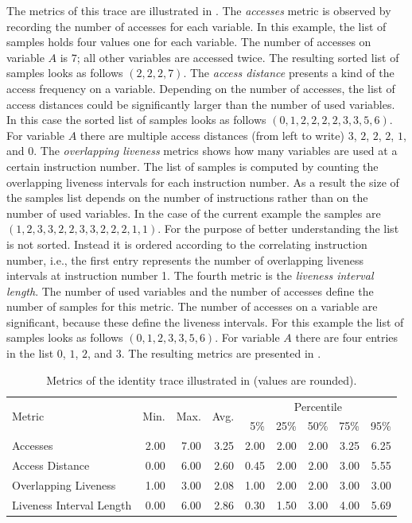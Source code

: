 \documentclass[onecolumn, openright, master, english, signatures]{dbrgrptt}
\begin{document}
The metrics of this \ac{trace} are illustrated in .
The \emph{accesses} metric is observed by recording the number of accesses for each variable.
In this example, the list of samples holds four values one for each variable.
The number of accesses on variable $A$ is $7$; all other variables are accessed twice.
The resulting sorted list of samples looks as follows $(2, 2, 2, 7)$.
The \emph{access distance} presents a kind of the access frequency on a variable.
Depending on the number of accesses, the list of access distances could be significantly larger than the number of used variables.
In this case the sorted list of samples looks as follows $(0, 1, 2, 2, 2, 2, 3, 3, 5, 6)$.
For variable $A$ there are multiple access distances (from left to write) $3$, $2$, $2$, $2$, $1$, and $0$.
The \emph{overlapping liveness} metrics shows how many variables are used at a certain instruction number.
The list of samples is computed by counting the overlapping liveness intervals for each instruction number.
As a result the size of the samples list depends on the number of instructions rather than on the number of used variables.
In the case of the current example the samples are $(1, 2, 3, 3, 2, 2, 3, 3, 2, 2, 2, 1, 1)$.
For the purpose of better understanding the list is not sorted.
Instead it is ordered according to the correlating instruction number, i.e., the first entry represents the number of overlapping liveness intervals at instruction number 1.
The fourth metric is the \emph{liveness interval length}.
The number of used variables and the number of accesses define the number of samples for this metric.
The number of accesses on a variable are significant, because these define the liveness intervals.
For this example the list of samples looks as follows $(0, 1, 2, 3, 3, 5, 6)$.
For variable $A$ there are four entries in the list $0$, $1$, $2$, and $3$.
The resulting metrics are presented in .

\begin{table}[!ht]
  \centering
  \begin{tabular}{lrrrrrrrr}
    \hline
    \multirow{2}{*}{Metric} & \multirow{2}{*}{Min.} & \multirow{2}{*}{Max.} & \multirow{2}{*}{Avg.} & \multicolumn{5}{c}{Percentile} \tabularnewline
    & & & & 5\% & 25\% & 50\% & 75\% & 95\% \tabularnewline
    \hline
    Accesses                 & 2.00 & 7.00 & 3.25 & 2.00 & 2.00 & 2.00 & 3.25 & 6.25 \\
    Access Distance          & 0.00 & 6.00 & 2.60 & 0.45 & 2.00 & 2.00 & 3.00 & 5.55 \\
    Overlapping Liveness     & 1.00 & 3.00 & 2.08 & 1.00 & 2.00 & 2.00 & 3.00 & 3.00 \\
    Liveness Interval Length & 0.00 & 6.00 & 2.86 & 0.30 & 1.50 & 3.00 & 4.00 & 5.69 \\
    \hline
  \end{tabular}
  \caption{Metrics of the identity \ac{trace} illustrated in  (values are rounded).}
  \label{tab:summarizing-example-metrics-original}
\end{table}
\end{document}

